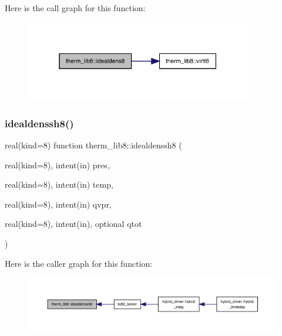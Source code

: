Here is the call graph for this function\+:
\nopagebreak
\begin{figure}[H]
\begin{center}
\leavevmode
\includegraphics[width=280pt]{namespacetherm__lib8_a18ba1889218ff1cf51e4b8ec9c612f02_cgraph}
\end{center}
\end{figure}
\mbox{\label{namespacetherm__lib8_a71a3a8a71ff6e3d11c6b604f495e5240}} 
\subsubsection{\texorpdfstring{idealdenssh8()}{idealdenssh8()}}
{\footnotesize\ttfamily real(kind=8) function therm\+\_\+lib8\+::idealdenssh8 (\begin{DoxyParamCaption}\item[{real(kind=8), intent(in)}]{pres,  }\item[{real(kind=8), intent(in)}]{temp,  }\item[{real(kind=8), intent(in)}]{qvpr,  }\item[{real(kind=8), intent(in), optional}]{qtot }\end{DoxyParamCaption})}

Here is the caller graph for this function\+:
\nopagebreak
\begin{figure}[H]
\begin{center}
\leavevmode
\includegraphics[width=350pt]{namespacetherm__lib8_a71a3a8a71ff6e3d11c6b604f495e5240_icgraph}
\end{center}
\end{figure}
\mbox{\label{namespacetherm__lib8_a0f6906696662a832ed73b03f8f97e449}} 
